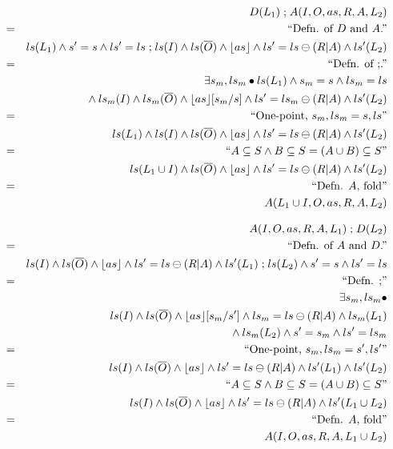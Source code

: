 \begin{eqnarray*}
  && D(L_1) \mathrel{;} A(I,O,as,R,A,L_2)
\\&=&\textrm{``Defn. of $D$ and $A$.''}
\\&& ls(L_1) \land s'=s \land ls'=ls
     \mathrel{;}
     ls(I) \land ls(\overline{O}) \land \lfloor as\rfloor \land ls'=ls\ominus(R|A) \land ls'(L_2)
\\&=&\textrm{``Defn. of $\mathrel{;}$.''}
\\&& \exists s_m,ls_m \bullet ls(L_1) \land s_m=s \land ls_m=ls
\\&& \qquad {} \land
     ls_m(I) \land ls_m(\overline{O}) \land \lfloor as\rfloor[s_m/s]
     \land ls'=ls_m \ominus (R|A) \land ls'(L_2)
\\&=&\textrm{``One-point, $s_m,ls_m = s,ls$''}
\\&& ls(L_1) \land
     ls(I) \land ls(\overline{O}) \land \lfloor as\rfloor
     \land ls'=ls \ominus (R|A) \land ls'(L_2)
\\&=&\textrm{``$A \subseteq S \land B \subseteq S = (A \cup B) \subseteq S$''}
\\&& ls(L_1 \cup I) \land ls(\overline{O}) \land \lfloor as\rfloor
     \land ls'=ls \ominus (R|A) \land ls'(L_2)
\\&=&\textrm{``Defn. $A$, fold''}
\\&& A(L_1 \cup I,O,as,R,A,L_2)
\end{eqnarray*}

\begin{eqnarray*}
  && A(I,O,as,R,A,L_1) \mathrel{;} D(L_2)
\\&=&\textrm{``Defn. of $A$ and $D$.''}
\\&& ls(I) \land ls(\overline{O}) \land \lfloor as\rfloor \land ls'=ls\ominus(R|A) \land ls'(L_1)
     \mathrel{;}
     ls(L_2) \land s'=s \land ls'=ls
\\&=&\textrm{``Defn. $\mathrel{;}$''}
\\&& \exists s_m,ls_m \bullet
\\&& \quad
     ls(I) \land ls(\overline{O}) \land \lfloor as\rfloor[s_m/s'] 
     \land ls_m=ls \ominus (R|A) \land ls_m(L_1)
\\&& {} \land
     ls_m(L_2) \land s'=s_m \land ls'=ls_m
\\&=&\textrm{``One-point, $s_m,ls_m = s',ls'$''}
\\&& ls(I) \land ls(\overline{O}) \land \lfloor as\rfloor 
\land ls'=ls \ominus (R|A) \land ls'(L_1)
     \land ls'(L_2)
\\&=&\textrm{``$A \subseteq S \land B \subseteq S = (A \cup B) \subseteq S$''}
\\&& ls(I) \land ls(\overline{O}) \land \lfloor as\rfloor \land ls'=ls \ominus (R|A)
     \land ls'(L_1 \cup L_2)
\\&=&\textrm{``Defn. $A$, fold''}
\\&& A(I,O,as,R,A,L_1 \cup L_2)
\end{eqnarray*}

